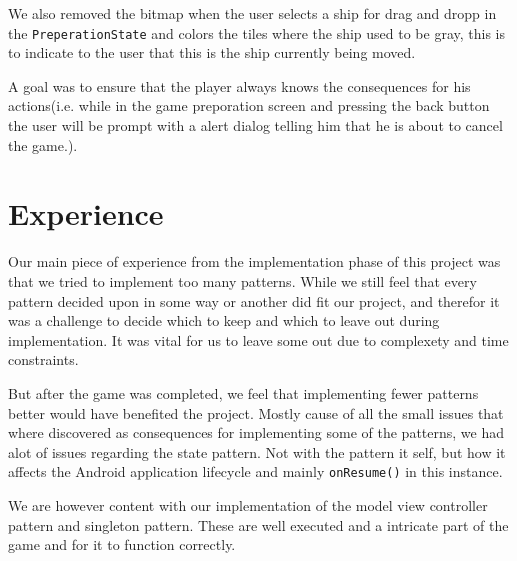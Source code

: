 We also removed the bitmap when the user selects a ship for drag and dropp in the \texttt{PreperationState} and colors the tiles where the ship used to be gray, this is to indicate to the user that this is the ship currently being moved.

A goal was to ensure that the player always knows the consequences for his actions(i.e. while in the game preporation screen and pressing the back button the user will be prompt with a alert dialog telling him that he is about to cancel the game.).


\section{Experience} %
Our main piece of experience from the implementation phase of this project was that we tried to implement too many patterns. While we still feel that every pattern decided upon in some way or another did fit our project, and therefor it was a challenge to decide which to keep and which to leave out during implementation. It was vital for us to leave some out due to complexety and time constraints. 

But after the game was completed, we feel that implementing fewer patterns better would have benefited the project. Mostly cause of all the small issues that where discovered as consequences for implementing some of the patterns, we had alot of issues regarding the state pattern. Not with the pattern it self, but how it affects the Android application lifecycle and mainly \texttt{onResume()} in this instance. 

We are however content with our implementation of the model view controller pattern and singleton pattern. These are well executed and a intricate part of the game and for it to function correctly.

